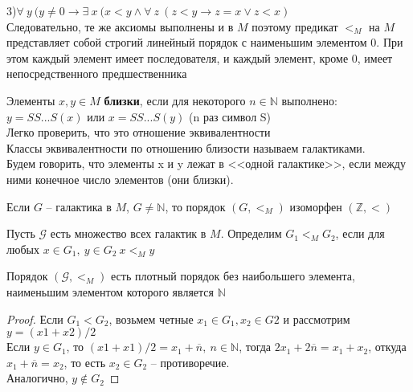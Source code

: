 3)$\forall\: y\: (y \neq 0 \rightarrow \exists \:x\:(x<y \wedge \forall\: z\:(z<y \rightarrow z=x \lor z<x)$\\
Следовательно, те же аксиомы выполнены и в $M$ поэтому предикат $<_M$ на $M$ представляет
собой строгий линейный порядок с наименьшим элементом
0. При этом каждый элемент имеет последователя, и каждый элемент, кроме 0, имеет непосредственного предшественника
\begin{definition}
	Элементы $x,y \in M$ \textbf{близки}, если для некоторого $n \in \mathbb{N}$ выполнено:
	$y=SS...S(x)$ или $x=SS...S(y)$ (n раз символ S)\\
	Легко проверить, что это отношение эквивалентности\\
	Классы эквивалентности по отношению близости называем галактиками.\\
	Будем говорить, что элементы x и y лежат в <<одной галактике>>, если между ними конечное число элементов (они
	близки).
\end{definition}
\begin{proposition}
	Если $G$ -- галактика в $M$, $G \neq \mathbb{N}$, то порядок
	$(G,<_M)$ изоморфен $(\mathbb{Z},<)$ 
\end{proposition}
Пусть $\mathcal{G}$ есть множество всех галактик в $M$. Определим $G_{1}<_{M} G_{2}$, если
для любых $x \in G_{1}, \ y \in G_{2}\: x<_{M} y$
\begin{theorem}
	Порядок  $\left(\mathcal{G},<_{M}\right)$ есть плотный порядок без наибольшего элемента, наименьшим элементом
	которого является $\mathbb{N}$
\end{theorem}
\begin{proof}
	Если $G_1<G_2$, возьмем четные $x_1 \in G_1,x_2 \in G2$ и
	рассмотрим $y=(x1+x2)/2$\\
	Если $y \in G_1$, то $(x1+x1)/2=x_1+\overline{n}, \ n\in \mathbb{N}$, тогда
	$2x_1+2\overline{n}=x_1+x_2$, откуда $x_1+\overline{n}=x_2$, то есть $x_2\in G_2$ --
	противоречие.\\
	Аналогично, $y \notin G_2$
\end{proof}
